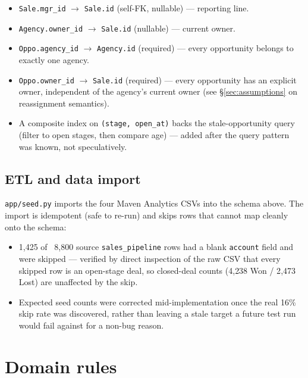 \documentclass[13pt, a4paper]{article}
\begin{document}
\begin{itemize}
    \item \texttt{Sale.mgr\_id} $\to$ \texttt{Sale.id} (self-FK, nullable) — reporting line.
    \item \texttt{Agency.owner\_id} $\to$ \texttt{Sale.id} (nullable) — current owner.
    \item \texttt{Oppo.agency\_id} $\to$ \texttt{Agency.id} (required) — every opportunity
        belongs to exactly one agency.
    \item \texttt{Oppo.owner\_id} $\to$ \texttt{Sale.id} (required) — every opportunity has an
        explicit owner, independent of the agency's current owner (see \S\ref{sec:assumptions}
        on reassignment semantics).
    \item A composite index on \texttt{(stage, open\_at)} backs the stale-opportunity query
        (filter to open stages, then compare age) — added after the query pattern was known,
        not speculatively.
\end{itemize}

\subsection{ETL and data import}
\label{subsec:etl}

\texttt{app/seed.py} imports the four Maven Analytics CSVs into the schema above. The import
is idempotent (safe to re-run) and skips rows that cannot map cleanly onto the schema:

\begin{itemize}
    \item 1{,}425 of ~8{,}800 source \texttt{sales\_pipeline} rows had a blank \texttt{account}
        field and were skipped — verified by direct inspection of the raw CSV that every
        skipped row is an open-stage deal, so closed-deal counts (4{,}238 Won / 2{,}473 Lost)
        are unaffected by the skip.
    \item Expected seed counts were corrected mid-implementation once the real 16\% skip rate
        was discovered, rather than leaving a stale target a future test run would fail
        against for a non-bug reason.
\end{itemize}

\section{Domain rules}
\label{sec:domain-rules}
\end{document}
